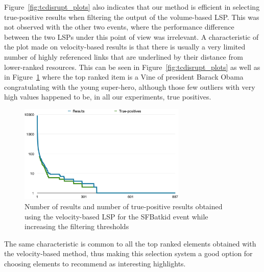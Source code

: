\documentclass{sig-alternate-somus}
\begin{document}
Figure~\ref{fig:tcdisrupt_plots} also indicates that our method is efficient in selecting true-positive results when filtering the output of the volume-based LSP. This was not observed with the other two events, where the performance difference between the two LSPs under this point of view was irrelevant. A characteristic of the plot made on velocity-based results is that there is usually a very limited number of highly referenced links that are underlined by their distance from lower-ranked resources. This can be seen in Figure~\ref{fig:tcdisrupt_plots} as well as in Figure~\ref{fig:sfbatkid_plot} where the top ranked item is a Vine of president Barack Obama congratulating with the young super-hero, although those few outliers with very high values happened to be, in all our experiments, true positives.
\begin{figure}[htbp]
  \centering
  \includegraphics[width=8cm]{Figures/batkid_plot.png}
  \caption{Number of results and number of true-positive results obtained using the velocity-based LSP for the SFBatkid event while increasing the filtering thresholds}
  \label{fig:sfbatkid_plot}
\end{figure}

The same characteristic is common to all the top ranked elements obtained with the velocity-based method, thus making this selection system a good option for choosing elements to recommend as interesting highlights.
\end{document}
